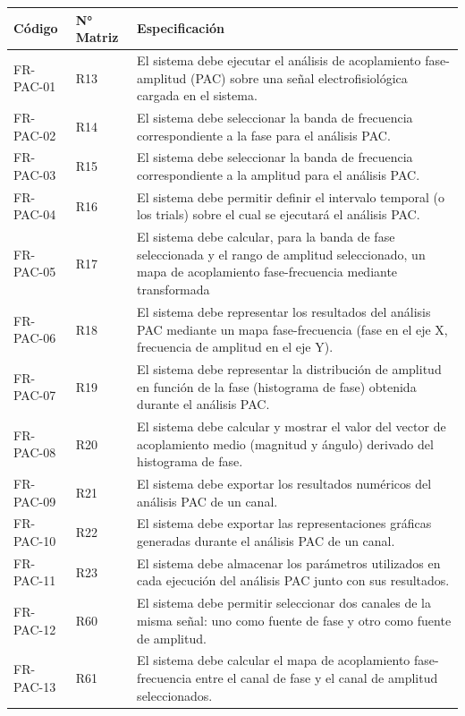 \documentclass[12pt, letterpaper]{article}
\begin{document}
\begin{longtable}{|p{2.5cm}|p{2.5cm}|p{10.1cm}|}
\hline
\rowcolor{gray!25}
\textbf{Código} & \textbf{N° Matriz} & \textbf{Especificación} \\
\hline
\endhead

\hline
\endlastfoot

FR-PAC-01 & R13 & El sistema debe ejecutar el análisis de acoplamiento fase-amplitud (PAC) sobre una señal electrofisiológica cargada en el sistema. \\
\hline
FR-PAC-02 & R14 & El sistema debe seleccionar la banda de frecuencia correspondiente a la fase para el análisis PAC. \\
\hline
FR-PAC-03 & R15 & El sistema debe seleccionar la banda de frecuencia correspondiente a la amplitud para el análisis PAC. \\
\hline
FR-PAC-04 & R16 & El sistema debe permitir definir el intervalo temporal (o los trials) sobre el cual se ejecutará el análisis PAC. \\
\hline
FR-PAC-05 & R17 & El sistema debe calcular, para la banda de fase seleccionada y el rango de amplitud seleccionado, un mapa de acoplamiento fase-frecuencia mediante transformada \\
\hline
FR-PAC-06 & R18 & El sistema debe representar los resultados del análisis PAC mediante un mapa fase-frecuencia (fase en el eje X, frecuencia de amplitud en el eje Y). \\
\hline
FR-PAC-07 & R19 & El sistema debe representar la distribución de amplitud en función de la fase (histograma de fase) obtenida durante el análisis PAC. \\
\hline
FR-PAC-08 & R20 & El sistema debe calcular y mostrar el valor del vector de acoplamiento medio (magnitud y ángulo) derivado del histograma de fase. \\
\hline
FR-PAC-09 & R21 & El sistema debe exportar los resultados numéricos del análisis PAC de un canal. \\
\hline
FR-PAC-10 & R22 & El sistema debe exportar las representaciones gráficas generadas durante el análisis PAC de un canal. \\
\hline
FR-PAC-11 & R23 & El sistema debe almacenar los parámetros utilizados en cada ejecución del análisis PAC junto con sus resultados. \\
\hline
FR-PAC-12 & R60 & El sistema debe permitir seleccionar dos canales de la misma señal: uno como fuente de fase y otro como fuente de amplitud. \\
\hline
FR-PAC-13 & R61 & El sistema debe calcular el mapa de acoplamiento fase-frecuencia entre el canal de fase y el canal de amplitud seleccionados. \\

\end{longtable}
\end{document}
